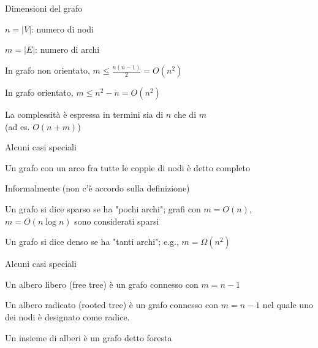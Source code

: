 \begin{frame}{Dimensioni del grafo}

\vspace{-6pt}
\BI
\item \alert{$n = |V|$}:	numero di nodi
\item \alert{$m = |E|$}:	numero di archi
\EI

\BIL
\item In grafo non orientato, $m \leq \frac{n(n-1)}{2} = O(n^2)$
\item In grafo orientato, $m \leq n^2-n = O(n^2)$
\EIL

\BIL
\item La complessità è espressa in termini sia di $n$ che di $m$\\ 
(ad es. $O(n+m)$)
\EIL

\end{frame}

\begin{frame}{Alcuni casi speciali}

\BIL
\item Un grafo con un arco fra tutte le coppie di nodi è detto \alert{completo} 
\item Informalmente (non c'è accordo sulla definizione)
  \BI
  \item Un grafo si dice \alert{sparso} se ha "pochi archi"; grafi con $m = O(n)$, $m = O(n \log n)$  sono considerati sparsi
\item Un grafo si dice \alert{denso} se ha "tanti archi"; e.g., $m =  \Omega(n^2)$
\EI
\EIL

\vspace{-12pt}
\end{frame}

\begin{frame}{Alcuni casi speciali}

\BIL
\item Un \alert{albero libero} (\alert{free tree}) è un grafo connesso con $m=n-1$
\item Un \alert{albero radicato} (\alert{rooted tree}) è un grafo connesso con $m=n-1$ nel quale  uno dei nodi è designato come radice.
\item Un insieme di alberi è un grafo detto \alert{\alert{foresta}}
\EIL

	
\end{frame}

